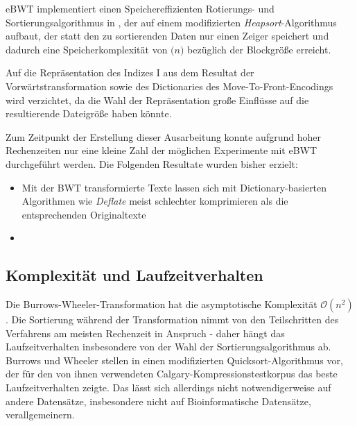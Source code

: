 \documentclass[ngerman,pdftex,paper=A4,DIV=calc,titlepage,12pt]{scrartcl}
\newtheorem[L]{boxedDefinition}{Definition}
\begin{document}
eBWT implementiert einen Speichereffizienten Rotierungs- und Sortierungsalgorithmus in , der auf einem modifizierten \textit{Heapsort}-Algorithmus aufbaut, der statt den zu sortierenden Daten nur einen Zeiger  speichert und dadurch eine Speicherkomplexität von $\mathcal(n)$ bezüglich der Blockgröße erreicht.

Auf die Repräsentation des Indizes I aus dem Resultat der Vorwärtstransformation sowie des Dictionaries des Move-To-Front-Encodings wird verzichtet, da die Wahl der Repräsentation große Einflüsse auf die resultierende Dateigröße haben könnte.

Zum Zeitpunkt der Erstellung dieser Ausarbeitung konnte aufgrund hoher Rechenzeiten nur eine kleine Zahl der möglichen Experimente mit eBWT durchgeführt werden. Die Folgenden Resultate wurden bisher erzielt:
\begin{itemize}
 \item Mit der BWT transformierte Texte lassen sich mit Dictionary-basierten Algorithmen wie \textit{Deflate} meist schlechter komprimieren als die entsprechenden Originaltexte
 \item 
\end{itemize}


\subsection{Komplexität und Laufzeitverhalten}
Die Burrows-Wheeler-Transformation hat die asymptotische Komplexität $\mathcal{O}(n^2)$. Die Sortierung während der Transformation nimmt von den Teilschritten des Verfahrens am meisten Rechenzeit in Anspruch - daher hängt das Laufzeitverhalten insbesondere von der Wahl der Sortierungsalgorithmus ab. Burrows und Wheeler stellen in \cite{burrows1994block} einen modifizierten Quicksort-Algorithmus vor, der für den von ihnen verwendeten Calgary-Kompressionstestkorpus das beste Laufzeitverhalten zeigte. Das lässt sich allerdings nicht notwendigerweise auf andere Datensätze, insbesondere nicht auf Bioinformatische Datensätze, verallgemeinern.
\end{document}

